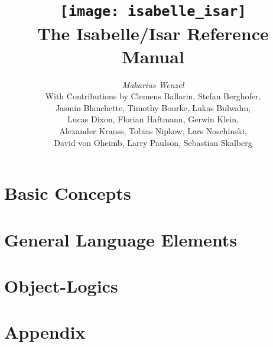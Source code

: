 \documentclass[12pt,a4paper,fleqn]{report}
\title{\texttt{[image: isabelle\_isar]} \\[4ex] The Isabelle/Isar Reference Manual}
\author{\emph{Makarius Wenzel} \\[3ex]
  With Contributions by
  Clemens Ballarin,
  Stefan Berghofer, \\
  Jasmin Blanchette,
  Timothy Bourke,
  Lukas Bulwahn, \\
  Lucas Dixon,
  Florian Haftmann,
  Gerwin Klein, \\
  Alexander Krauss,
  Tobias Nipkow,
  Lars Noschinski, \\
  David von Oheimb,
  Larry Paulson,
  Sebastian Skalberg
}
\let\intorig=\int  %
\begin{document}
\maketitle 

{\def\isamarkupchapter#1{\chapter*{#1}}}
\tableofcontents
\clearfirst

\part{Basic Concepts}



\part{General Language Elements}







\part{Object-Logics}




\part{Appendix}
\appendix

\let\int\intorig



\begingroup
   \small\raggedright\frenchspacing
  
\endgroup

\printindex
\end{document}
